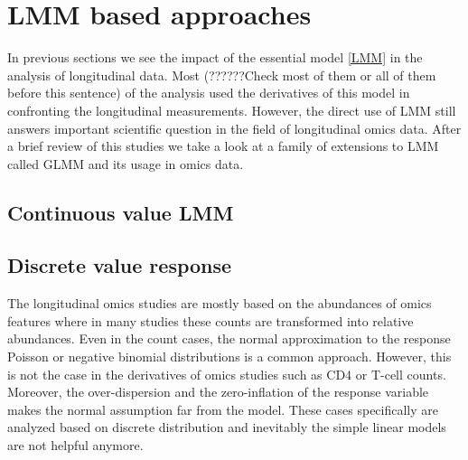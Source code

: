 \documentclass[]{article}
\begin{document}
		
		
		
		
		\cite{Colosimo2012} 
		
		
		
		
		
		
		\section{LMM based approaches}
		In previous sections we see the impact of the essential model \eqref{LMM} in the analysis of longitudinal data. Most (??????Check most of them or all of them before this sentence) of the analysis used the derivatives of this model in confronting the longitudinal measurements. However, the direct use of LMM still answers important scientific question in the field of longitudinal omics data. After a brief review of this studies we take a look at a family of extensions to LMM called GLMM and its usage in omics data.
		\subsection{Continuous value LMM}
		\subsection{Discrete value response}
  The longitudinal omics studies are mostly based on the abundances of omics features where in many studies these counts are transformed into relative abundances. Even in the count cases, the normal approximation to the response Poisson or negative binomial distributions is a common approach. However, this is not the case in the derivatives of omics studies such as CD4 or T-cell counts. Moreover, the over-dispersion and the zero-inflation of the response variable makes the normal assumption far from the model. These cases specifically are analyzed based on discrete distribution and inevitably the simple linear models are not helpful anymore.
\end{document}
